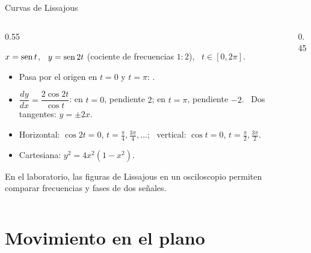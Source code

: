 \documentclass[10pt,aspectratio=169]{beamer}
\begin{document}
\begin{frame}{Curvas de Lissajous}
  \begin{columns}
    \begin{column}{0.55\textwidth}
      \begin{ejemplo}[5]
        $x=\operatorname{sen} t$, \ $y=\operatorname{sen}2t$ (cociente de frecuencias $1:2$), \ $t\in[0,2\pi]$.
        \begin{itemize}
          \item Pasa por el origen en $t=0$ y $t=\pi$: .
          \item $\dfrac{dy}{dx}=\dfrac{2\cos2t}{\cos t}$: en $t=0$, pendiente $2$; en $t=\pi$, pendiente $-2$. \ Dos tangentes: $y=\pm2x$.
          \item Horizontal: $\cos2t=0$, $t=\frac\pi4,\frac{3\pi}4,\dots$; \ vertical: $\cos t=0$, $t=\frac\pi2,\frac{3\pi}2$.
          \item Cartesiana: $y^2=4x^2(1-x^2)$.
        \end{itemize}
      \end{ejemplo}
      \small En el laboratorio, las figuras de Lissajous en un osciloscopio permiten comparar frecuencias y fases de dos señales.
    \end{column}
    \begin{column}{0.45\textwidth}
      \centering
    \end{column}
  \end{columns}
\end{frame}

\section{Movimiento en el plano}
\end{document}
